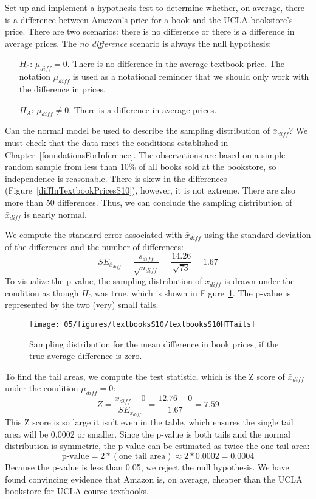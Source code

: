 \begin{example}{Set up and implement a hypothesis test to determine whether, on average, there is a difference between Amazon's price for a book and the UCLA bookstore's price.}
\label{htForDiffInUCLAAndAmazonTextbookPrices}
There are two scenarios: there is no difference or there is a difference in average prices. The \emph{no difference} scenario is always the null hypothesis:
\begin{itemize}
\item[$H_0$:] $\mu_{diff}=0$. There is no difference in the average textbook price. The notation $\mu_{diff}$ is used as a notational reminder that we should only work with the difference in prices.
\item[$H_A$:] $\mu_{diff} \neq 0$. There is a difference in average prices.
\end{itemize}
Can the normal model be used to describe the sampling distribution of $\bar{x}_{diff}$? We must check that the  data meet the conditions established in Chapter~\ref{foundationsForInference}. The observations are based on a simple random sample from less than 10\% of all books sold at the bookstore, so independence is reasonable. There is skew in the differences (Figure~\ref{diffInTextbookPricesS10}), however, it is not extreme. There are also more than 50 differences. Thus, we can conclude the sampling distribution of $\bar{x}_{diff}$ is nearly normal.

We compute the standard error associated with $\bar{x}_{diff}$ using the standard deviation of the differences and the number of differences:
$$SE_{\bar{x}_{diff}} = \frac{s_{diff}}{\sqrt{n_{diff}}} = \frac{14.26}{\sqrt{73}} = 1.67$$
To visualize the p-value, the sampling distribution of $\bar{x}_{diff}$ is drawn under the condition as though $H_0$ was true, which is shown in Figure~\ref{textbooksS10HTTails}. The p-value is represented by the two (very) small tails.
\begin{figure}
\centering
\texttt{[image: 05/figures/textbooksS10/textbooksS10HTTails]}
\caption{Sampling distribution for the mean difference in book prices, if the true average difference is zero.}
\label{textbooksS10HTTails}
\end{figure}

To find the tail areas, we compute the test statistic, which is the Z score of $\bar{x}_{diff}$ under the condition $\mu_{diff} = 0$:
$$Z = \frac{\bar{x}_{diff} - 0}{SE_{x_{diff}}} = \frac{12.76 - 0}{1.67} = 7.59$$
This Z score is so large it isn't even in the table, which ensures the single tail area will be 0.0002 or smaller. Since the p-value is both tails and the normal distribution is symmetric, the p-value can be estimated as twice the one-tail area:
$$\text{p-value} = 2*(\text{one tail area}) \approx 2*0.0002 = 0.0004$$
Because the p-value is less than 0.05, we reject the null hypothesis. We have found convincing evidence that Amazon is, on average, cheaper than the UCLA bookstore for UCLA course textbooks.
\end{example}

